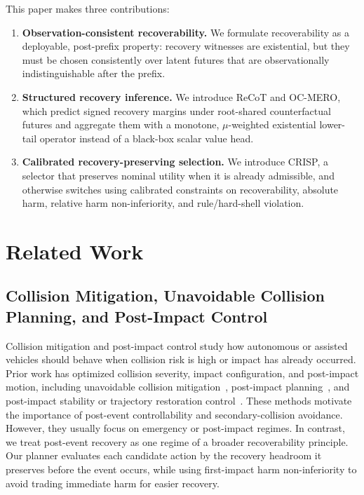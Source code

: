 \documentclass[conference]{IEEEtran}
\begin{document}
This paper makes three contributions:
\begin{enumerate}[leftmargin=*]
    \item \textbf{Observation-consistent recoverability.} We formulate recoverability as a deployable, post-prefix property: recovery witnesses are existential, but they must be chosen consistently over latent futures that are observationally indistinguishable after the prefix.
    \item \textbf{Structured recovery inference.} We introduce ReCoT and OC-MERO, which predict signed recovery margins under root-shared counterfactual futures and aggregate them with a monotone, $\mu$-weighted existential lower-tail operator instead of a black-box scalar value head.
    \item \textbf{Calibrated recovery-preserving selection.} We introduce CRISP, a selector that preserves nominal utility when it is already admissible, and otherwise switches using calibrated constraints on recoverability, absolute harm, relative harm non-inferiority, and rule/hard-shell violation.
\end{enumerate}

\section{Related Work}

\subsection{Collision Mitigation, Unavoidable Collision Planning, and Post-Impact Control}
Collision mitigation and post-impact control study how autonomous or assisted vehicles should behave when collision risk is high or impact has already occurred. Prior work has optimized collision severity, impact configuration, and post-impact motion, including unavoidable collision mitigation~\cite{li2022vehicle,bosia2024real}, post-impact planning~\cite{wang2023integrated,parseh2023motion}, and post-impact stability or trajectory restoration control~\cite{yang2025post,wang2024post,ghosh2026post}. These methods motivate the importance of post-event controllability and secondary-collision avoidance. However, they usually focus on emergency or post-impact regimes. In contrast, we treat post-event recovery as one regime of a broader recoverability principle. Our planner evaluates each candidate action by the recovery headroom it preserves before the event occurs, while using first-impact harm non-inferiority to avoid trading immediate harm for easier recovery.
\end{document}
